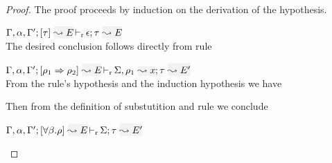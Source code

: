 \begin{proof}
The proof proceeds by induction on the derivation of the hypothesis.
\begin{description}
\setlength{\itemsep}{1em}
\item[\fbox{\rref{M-Simp}}]\quad$\dmres{\tenv,\alpha,\tenv'}{\type}{E}{\type}{E}{\epsilon}$\\

The desired conclusion follows directly from rule 
\begin{myequation*}
\end{myequation*}

\item[\fbox{\rref{M-IApp}}]\quad$\dmres{\tenv,\alpha,\tenv'}{\rulet_1 \To \rulet_2}{E}{\type}{E'}{\Sigma,\ie{\rulet_1}{x}}$\\

From the rule's hypothesis and the induction hypothesis we have 
\begin{myequation*}
\end{myequation*}
  Then from the definition of substutition and rule  we conclude
\begin{myequation*}
\end{myequation*}

\item[\fbox{\rref{M-TApp}}]\quad$\dmres{\tenv,\alpha,\tenv'}{\tall{\beta}{\rulet}}{E}{\type}{E'}{\Sigma}$\\


\end{description}
\end{proof}

